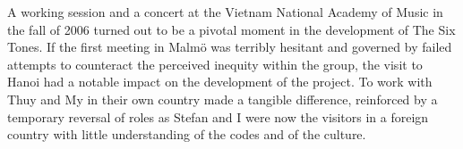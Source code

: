 \documentclass[a4paper]{article}
\begin{document}
A working session and a concert at the Vietnam National Academy of Music in the fall of 2006 turned out to be a pivotal moment in the development of The Six Tones. If the first meeting in Malmö was terribly hesitant and governed by failed attempts to counteract the perceived inequity within the group, the visit to Hanoi had a notable impact on the development of the project. To work with Thuy and My in their own country made a tangible difference, reinforced by a temporary reversal of roles as Stefan and I were now the visitors in a foreign country with little understanding of the codes and of the culture.

\end{document}
